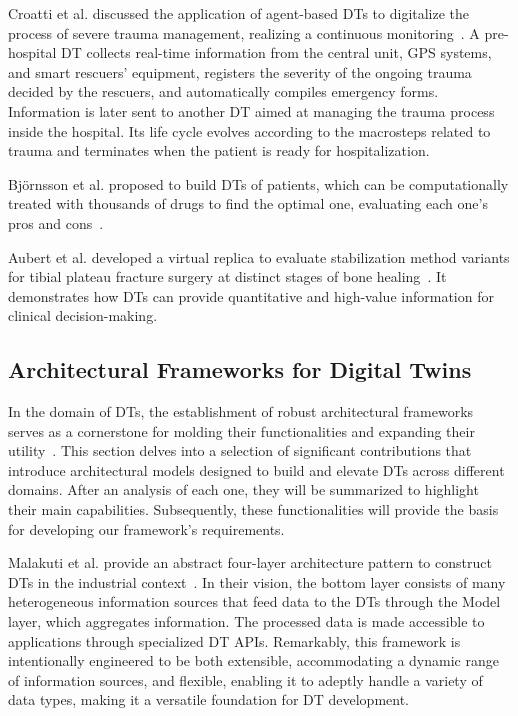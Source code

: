 Croatti et al. discussed the application of agent-based DTs to digitalize the process of severe trauma management, realizing a continuous monitoring~\cite{croatti_integration_2020}. A pre-hospital DT collects real-time information from the central unit, GPS systems, and smart rescuers’ equipment, registers the severity of the ongoing trauma decided by the rescuers, and automatically compiles emergency forms. Information is later sent to another DT aimed at managing the trauma process inside the hospital. Its life cycle evolves according to the macrosteps related to trauma and terminates when the patient is ready for hospitalization.

Björnsson et al. proposed to build DTs of patients, which can be computationally treated with thousands of drugs to find the optimal one, evaluating each one’s pros and cons~\cite{Björnsson2019}.  

Aubert et al. developed a virtual replica to evaluate stabilization method variants for tibial plateau fracture surgery at distinct stages of bone healing~\cite{aubert_development_2021}. It demonstrates how DTs can provide quantitative and high-value information for clinical decision-making. 

\subsection{Architectural Frameworks for Digital Twins}\label{sec:paper5_architectural-frameworks}
In the domain of DTs, the establishment of robust architectural frameworks serves as a cornerstone for molding their functionalities and expanding their utility~\cite{minerva_digital_2021}. This section delves into a selection of significant contributions that introduce architectural models designed to build and elevate DTs across different domains. After an analysis of each one, they will be summarized to highlight their main capabilities. Subsequently, these functionalities will provide the basis for developing our framework's requirements. 

Malakuti et al. provide an abstract four-layer architecture pattern to construct DTs in the industrial context~\cite{malakuti_four-layer_2019}. In their vision, the bottom layer consists of many heterogeneous information sources that feed data to the DTs through the Model layer, which aggregates information. The processed data is made accessible to applications through specialized DT APIs. Remarkably, this framework is intentionally engineered to be both extensible, accommodating a dynamic range of information sources, and flexible, enabling it to adeptly handle a variety of data types, making it a versatile foundation for DT development. 

